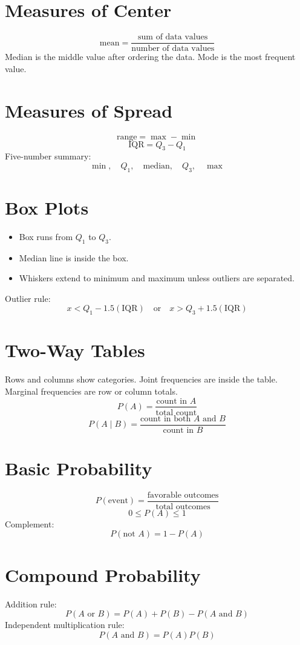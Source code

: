 \documentclass[11pt]{article}
\begin{document}

\section*{Measures of Center}
\[
\text{mean}=\frac{\text{sum of data values}}{\text{number of data values}}
\]
Median is the middle value after ordering the data. Mode is the most frequent value.

\section*{Measures of Spread}
\[
\text{range}=\max-\min
\]
\[
\text{IQR}=Q_3-Q_1
\]
Five-number summary:
\[
\min,\quad Q_1,\quad \text{median},\quad Q_3,\quad \max
\]

\section*{Box Plots}
\begin{itemize}
  \item Box runs from $Q_1$ to $Q_3$.
  \item Median line is inside the box.
  \item Whiskers extend to minimum and maximum unless outliers are separated.
\end{itemize}
Outlier rule:
\[
x<Q_1-1.5(\mathrm{IQR})\quad \text{or}\quad x>Q_3+1.5(\mathrm{IQR})
\]

\section*{Two-Way Tables}
Rows and columns show categories. Joint frequencies are inside the table. Marginal frequencies are row or column totals.
\[
P(A)=\frac{\text{count in }A}{\text{total count}}
\]
\[
P(A\mid B)=\frac{\text{count in both }A\text{ and }B}{\text{count in }B}
\]

\section*{Basic Probability}
\[
P(\text{event})=\frac{\text{favorable outcomes}}{\text{total outcomes}}
\]
\[
0\le P(A)\le1
\]
Complement:
\[
P(\text{not }A)=1-P(A)
\]

\section*{Compound Probability}
Addition rule:
\[
P(A\text{ or }B)=P(A)+P(B)-P(A\text{ and }B)
\]
Independent multiplication rule:
\[
P(A\text{ and }B)=P(A)P(B)
\]
\end{document}
